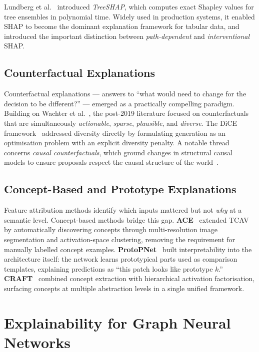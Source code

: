 \documentclass[12pt]{article}
\begin{document}
Lundberg et al.~\cite{lundberg2020treeshap} introduced \emph{TreeSHAP}, which
computes exact Shapley values for tree ensembles in polynomial time. Widely used
in production systems, it enabled SHAP to become the dominant explanation
framework for tabular data, and introduced the important distinction between
\emph{path-dependent} and \emph{interventional} SHAP.

\subsection{Counterfactual Explanations}

Counterfactual explanations --- answers to ``what would need to change for the
decision to be different?'' --- emerged as a practically compelling paradigm.
Building on Wachter et al.~\cite{wachter2017counterfactual}, the post-2019
literature focused on counterfactuals that are simultaneously \emph{actionable},
\emph{sparse}, \emph{plausible}, and \emph{diverse}. The DiCE
framework~\cite{mothilal2020dice} addressed diversity directly by formulating
generation as an optimisation problem with an explicit diversity penalty. A
notable thread concerns \emph{causal counterfactuals}, which ground changes in
structural causal models to ensure proposals respect the causal structure of the
world~\cite{verma2020counterfactual}.

\subsection{Concept-Based and Prototype Explanations}

Feature attribution methods identify which inputs mattered but not \emph{why} at
a semantic level. Concept-based methods bridge this gap.
\textbf{ACE}~\cite{ghorbani2019ace} extended TCAV~\cite{kim2018tcav} by
automatically discovering concepts through multi-resolution image segmentation and
activation-space clustering, removing the requirement for manually labelled
concept examples. \textbf{ProtoPNet}~\cite{chen2019protopnet} built
interpretability into the architecture itself: the network learns prototypical
parts used as comparison templates, explaining predictions as ``this patch looks
like prototype $k$.'' \textbf{CRAFT}~\cite{fel2023craft} combined concept
extraction with hierarchical activation factorisation, surfacing concepts at
multiple abstraction levels in a single unified framework.

\section{Explainability for Graph Neural Networks}
\label{sec:gnn}
\end{document}
